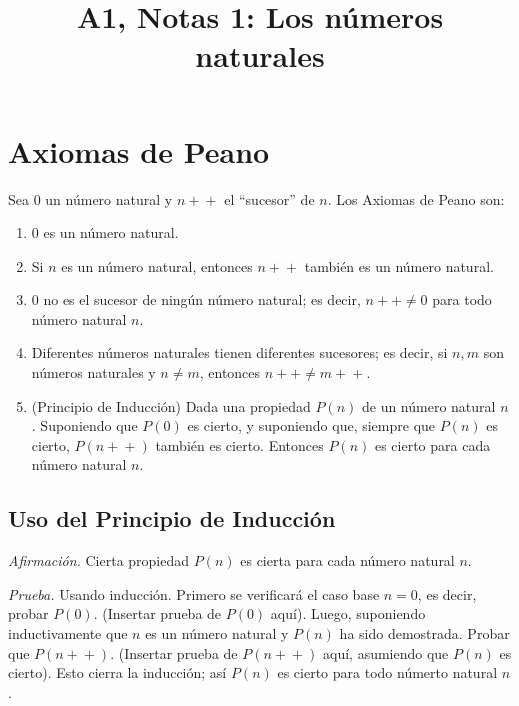 

\title{A1, Notas 1: Los números naturales}

\maketitle


\section{Axiomas de Peano}

Sea $0$ un número natural y $n\!+\!\!+$ el ``sucesor'' de $n$. Los Axiomas de Peano son:

\begin{enumerate}
\item $0$ es un número natural.

\item Si $n$ es un número natural, entonces $n\!+\!\!+$ también es un número natural.

\item $0$ no es el sucesor de ningún número natural; es decir, $n\!+\!\!+ \neq 0$ para todo número natural $n$.

\item Diferentes números naturales tienen diferentes sucesores; es decir, si $n, m$ son números naturales y $n \neq m$, entonces $n\!+\!\!+ \neq m\!+\!\!+$.

\item (Principio de Inducción) Dada una propiedad $P(n)$ de un número natural $n$. Suponiendo que $P(0)$ es cierto, y suponiendo que, siempre que $P(n)$ es cierto, $P(n\!+\!\!+)$ también es cierto. Entonces $P(n)$ es cierto para cada número natural $n$.
\end{enumerate}




\subsection{Uso del Principio de Inducción}

\emph{Afirmación.} Cierta propiedad $P(n)$ es cierta para cada número natural $n$.

\emph{Prueba.} Usando inducción. Primero se verificará el caso base $n = 0$, es decir, probar $P(0)$. (Insertar prueba de $P(0)$ aquí). Luego, suponiendo inductivamente que $n$ es un número natural y $P(n)$ ha sido demostrada. Probar que $P(n\!+\!\!+)$. (Insertar prueba de $P(n\!+\!\!+)$ aquí, asumiendo que $P(n)$ es cierto). Esto cierra la inducción; así $P(n)$ es cierto para todo númerto natural $n$.




